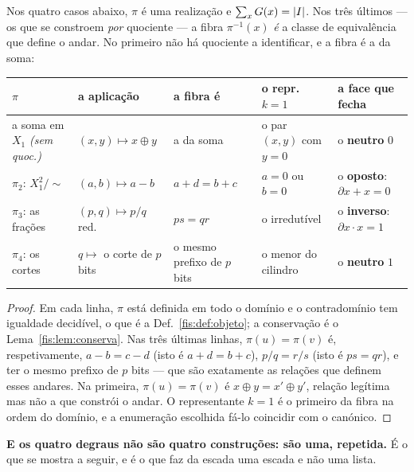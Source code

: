 \documentclass[livro.tex]{subfiles}
\begin{document}
\begin{teorema}\label{fis:thm:escada}
Nos quatro casos abaixo, $\pi$ é uma realização e $\sum_x G(x)=\lvert I\rvert$. Nos três
últimos --- os que se constroem \emph{por} quociente --- a fibra $\pi^{-1}(x)$
\emph{é} a classe de equivalência que define o andar. No primeiro não há
quociente a identificar, e a fibra é a da soma:
\begin{center}\footnotesize
\begin{tabular}{@{}lllll@{}}
\toprule
$\pi$ & a aplicação & a fibra é & o repr. $k=1$ & a \textbf{face} que fecha \\
\midrule
a soma em $X_1$ \emph{(sem quoc.)} & $(x,y)\mapsto x\oplus y$ & a da soma & o par $(x,y)$ com $y=0$ & o \textbf{neutro} $0$ \\
$\pi_2$: $X_1^{2}/{\sim}$ & $(a,b)\mapsto a-b$ & $a+d=b+c$ & $a=0$ ou $b=0$ & o \textbf{oposto}: $\partial x+x=0$ \\
$\pi_3$: as frações & $(p,q)\mapsto p/q$ red. & $ps=qr$ & o irredutível & o \textbf{inverso}: $\partial x\cdot x=1$ \\
$\pi_4$: os cortes & $q\mapsto$ o corte de $p$ bits & o mesmo prefixo de $p$ bits & o menor do cilindro & o \textbf{neutro} $1$ \\
\bottomrule
\end{tabular}
\end{center}
\end{teorema}

\begin{proof}
Em cada linha, $\pi$ está definida em todo o domínio e o contradomínio tem
igualdade decidível, o que é a Def.~\ref{fis:def:objeto}; a conservação é o
Lema~\ref{fis:lem:conserva}. Nas três últimas linhas, $\pi(u)=\pi(v)$ é,
respetivamente, $a-b=c-d$ (isto é $a+d=b+c$), $p/q=r/s$ (isto é $ps=qr$), e ter o
mesmo prefixo de $p$ bits --- que são exatamente as relações que definem esses
andares. Na primeira, $\pi(u)=\pi(v)$ é $x\oplus y=x'\oplus y'$, relação legítima
mas não a que constrói o andar. O representante $k=1$ é o primeiro da fibra na
ordem do domínio, e a enumeração escolhida fá-lo coincidir com o canónico.
\end{proof}

\medskip\noindent\textbf{E os quatro degraus não são quatro construções: são uma,
repetida.} É o que se mostra a seguir, e é o que faz da escada uma escada e não
uma lista.
\end{document}
